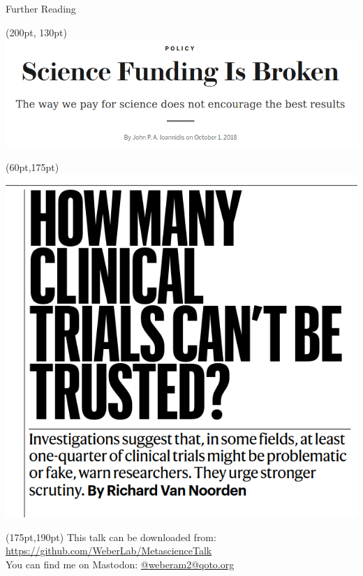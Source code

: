 \documentclass{beamer}
\begin{document}
\begin{frame}{Further Reading}
	\begin{textblock*}{160pt}(200pt, 130pt)
		\includegraphics[width=1\textwidth]{../images/sciencefunding.png}
	\end{textblock*}

	\begin{textblock*}{80pt}(60pt,175pt)
		\includegraphics[width=1\textwidth]{../images/25percentClinicalTrialsFalse.png}
	\end{textblock*}

	\begin{textblock*}{200pt}(175pt,190pt)
		This talk can be downloaded from: \url{https://github.com/WeberLab/MetascienceTalk}\\
		You can find me on Mastodon: \href{https://qoto.org/@weberam2}{@weberam2@qoto.org}
	\end{textblock*}

\end{frame}
\end{document}
